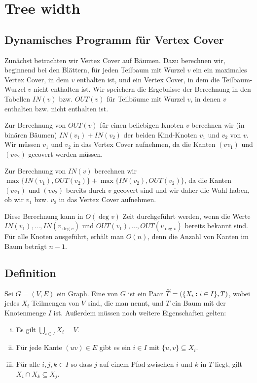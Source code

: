 \chapter{Tree width}

\section{Dynamisches Programm für Vertex Cover}
  Zunächst betrachten wir Vertex Cover auf Bäumen. Dazu berechnen wir, beginnend bei den Blättern, für jeden Teilbaum mit Wurzel \(v\) ein ein maximales Vertex Cover, in dem \(v\) enthalten ist, und ein Vertex Cover, in dem die Teilbaum-Wurzel \(v\) nicht enthalten ist. Wir speichern die Ergebnisse der Berechnung in den Tabellen \(IN(v)\) bzw. \(OUT(v)\) für Teilbäume mit Wurzel \(v\), in denen \(v\) enthalten bzw. nicht enthalten ist.

  Zur Berechnung von \(OUT(v)\) für einen beliebigen Knoten \(v\) berechnen wir (in binären Bäumen) \(IN(v_1) + IN(v_2)\) der beiden Kind-Knoten \(v_1\) und \(v_2\) von \(v\). Wir müssen \(v_1\) und \(v_2\) in das Vertex Cover aufnehmen, da die Kanten \((vv_1)\) und \((vv_2)\) gecovert werden müssen.

  Zur Berechnung von \(IN(v)\) berechnen wir \(\max \{ IN(v_1), OUT(v_2) \} + \max \{ IN(v_2), OUT(v_2) \}\), da die Kanten \((vv_1)\) und \((vv_2)\) bereits durch \(v\) gecovert sind und wir daher die Wahl haben, ob wir \(v_1\) bzw. \(v_2\) in das Vertex Cover aufnehmen.

  Diese Berechnung kann in \(O(\deg v)\) Zeit durchgeführt werden, wenn die Werte \(IN(v_1), ..., IN(v_{\deg v})\) und \(OUT(v_1), ..., OUT(v_{\deg v})\) bereits bekannt sind. Für alle Knoten ausgeführt, erhält man \(O(n)\), denn die Anzahl von Kanten im Baum beträgt \(n-1\).

\section{Definition}
  
  Sei \(G = (V,E)\) ein Graph. Eine  von \(G\) ist ein Paar \(\widetilde{T} = ( \{ X_i : i \in I \}, T )\), wobei jedes \(X_i\) Teilmengen von \(V\) sind, die man  nennt, und \(T\) ein Baum mit der Knotenmenge \(I\) ist. Außerdem müssen noch weitere Eigenschaften gelten:
  \begin{enumerate}[(i)]
   \item Es gilt \(\bigcup_{i \in I} X_i = V\).
   \item Für jede Kante \((uv) \in E\) gibt es ein \(i \in I\) mit \(\{u,v\} \subseteq X_i\).
   \item Für alle \(i,j,k \in I\) so dass \(j\) auf einem Pfad zwischen \(i\) und \(k\) in \(T\) liegt, gilt \(X_i \cap X_k \subseteq X_j\).
  \end{enumerate}
  
